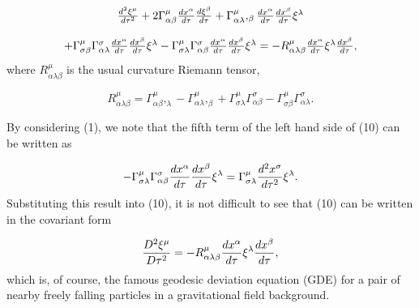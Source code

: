 \documentclass[a4paper,12pt]{article}
\begin{document}
\begin{equation}
\begin{array}{c}
\frac{d^{2}\xi ^{\mu }}{d\tau ^{2}}+2\Gamma _{\alpha \beta }^{\mu }\frac{%
dx^{\alpha }}{d\tau }\frac{d\xi ^{\beta }}{d\tau }+\Gamma _{\alpha \lambda
}^{\mu },_{\beta }\frac{dx^{\alpha }}{d\tau }\frac{dx^{\beta }}{d\tau }\xi
^{\lambda } \\ 
\\ 
+\Gamma _{\sigma \beta }^{\mu }\Gamma _{\alpha \lambda }^{\sigma }\frac{%
dx^{\alpha }}{d\tau }\frac{dx^{\beta }}{d\tau }\xi ^{\lambda }-\Gamma
_{\sigma \lambda }^{\mu }\Gamma _{\alpha \beta }^{\sigma }\frac{dx^{\alpha }%
}{d\tau }\frac{dx^{\beta }}{d\tau }\xi ^{\lambda }=-R_{\alpha \lambda \beta
}^{\mu }\frac{dx^{\alpha }}{d\tau }\xi ^{\lambda }\frac{dx^{\beta }}{d\tau },
\end{array}
\label{10}
\end{equation}
where $R_{\alpha \lambda \beta }^{\mu }$ is the usual curvature Riemann
tensor,

\begin{equation}
R_{\alpha \lambda \beta }^{\mu }=\Gamma _{\alpha \beta }^{\mu },_{\lambda
}-\Gamma _{\alpha \lambda }^{\mu },_{\beta }+\Gamma _{\sigma \lambda }^{\mu
}\Gamma _{\alpha \beta }^{\sigma }-\Gamma _{\sigma \beta }^{\mu }\Gamma
_{\alpha \lambda }^{\sigma }.  \label{11}
\end{equation}

By considering (1), we note that the fifth term of the left hand side of
(10) can be written as

\begin{equation}
-\Gamma _{\sigma \lambda }^{\mu }\Gamma _{\alpha \beta }^{\sigma }\frac{%
dx^{\alpha }}{d\tau }\frac{dx^{\beta }}{d\tau }\xi ^{\lambda }=\Gamma
_{\sigma \lambda }^{\mu }\frac{d^{2}x^{\sigma }}{d\tau ^{2}}\xi ^{\lambda }.
\label{12}
\end{equation}
Substituting this result into (10), it is not difficult to see that (10) can
be written in the covariant form

\begin{equation}
\frac{D^{2}\xi ^{\mu }}{D\tau ^{2}}=-R_{\alpha \lambda \beta }^{\mu }\frac{%
dx^{\alpha }}{d\tau }\xi ^{\lambda }\frac{dx^{\beta }}{d\tau },  \label{13}
\end{equation}
which is, of course, the famous geodesic deviation equation (GDE) for a pair
of nearby freely falling particles in a gravitational field background.


\bigskip\bigskip\bigskip\bigskip\ 
\end{document}
